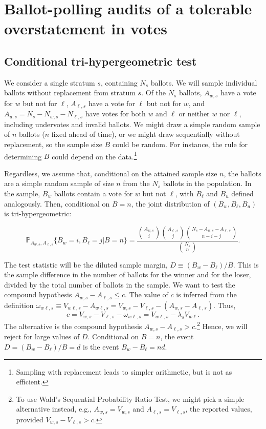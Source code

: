 \section{Ballot-polling audits of a tolerable overstatement in votes}
\label{sec:ballotPollError}

\subsection{Conditional tri-hypergeometric test}

We consider a single stratum $s$, containing $N_s$ ballots.
We will sample individual ballots without replacement from stratum $s$.
Of the $N_s$ ballots,
$A_{w,s}$ have a vote for $w$ but not for $\ell$, $A_{\ell,s}$ have a vote for $\ell$ but not for $w$, and $A_{u,s} = N_s - N_{w,s} - N_{\ell,s}$ have votes for both $w$ and $\ell$ or neither $w$ nor $\ell$, including undervotes and invalid ballots.
We might draw a simple random sample of $n$ ballots ($n$ fixed ahead of time), or we might draw 
sequentially without replacement, so the sample size $B$ could be random.
For instance, the rule for determining $B$ could depend on the data.\footnote{%
   Sampling with replacement leads to simpler arithmetic, but is not as efficient.
}

Regardless, we assume that, conditional on the attained sample size $n$, the ballots are a simple random sample of size $n$ from the $N_s$ ballots in the population.
In the sample, $B_w$ ballots contain a vote for $w$ but not $\ell$, with $B_\ell$ and $B_u$ defined analogously.
Then, conditional on $B=n$, the joint distribution of
$(B_w, B_\ell, B_u)$ is tri-hypergeometric:

\begin{equation}
    \mathbb{P}_{A_{w,s}, A_{\ell,s}} \{ B_w = i, B_\ell = j \vert B=n \} = 
     \frac{ {A_{w,s } \choose i}{A_{\ell,s} \choose j}{N_s - A_{w,s} - A_{\ell,s} \choose n-i-j}}{{N_s \choose n}}.
\end{equation}

The test statistic will be the diluted sample margin, $D \equiv (B_w - B_\ell)/B$.
This is the sample difference in the number of ballots for the winner and for the loser, divided by the 
total number of ballots in the sample.
We want to test the compound hypothesis $A_{w,s} - A_{\ell,s} \le c$.
The value of $c$ is inferred from the definition
$\omega_{w\ell,s} \equiv V_{w\ell,s} - A_{w\ell,s} = V_{w,s} - V_{\ell,s} - (A_{w,s} -A_{\ell,s})$.
Thus,
$$
    c = V_{w,s} - V_{\ell,s} - \omega_{w\ell,s} = V_{w\ell,s} - \lambda_s V_{w\ell}.
$$
The alternative is the compound hypothesis 
$A_{w,s} - A_{\ell,s} > c$.\footnote{%
    To use Wald's Sequential Probability Ratio Test, we might pick a simple alternative instead, e.g.,
   $A_{w,s} = V_{w,s}$ and $A_{\ell,s} = V_{\ell,s}$, the reported values, provided 
   $V_{w,s} - V_{\ell,s} > c$.
}
Hence, we will reject for large values of $D$.
Conditional on $B=n$, the event $D = (B_w - B_\ell)/B = d$ is the event $B_w - B_\ell = nd$.

